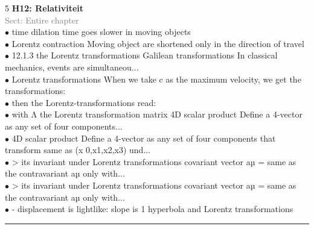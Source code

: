 \documentclass[7pt,a4paper]{article}
\begin{document}
\begin{multicols*}{5}
\textbf{H12: Relativiteit}\\\textcolor{gray}{{Sect: Entire chapter}}\\\vspace{0.5pt}
$\bullet$ time dilation time goes slower in moving objects\\
$\bullet$ Lorentz contraction Moving object are shortened only in the direction of travel\\
$\bullet$ 12.1.3 the Lorentz transformations
Galilean transformations In classical mechanics, events are simultaneou...\\
$\bullet$ Lorentz transformations When we take c as the maximum velocity, we get the transformations:\\
$\bullet$ then the Lorentz-transformations read:\\
$\bullet$ with Λ the Lorentz transformation matrix
4D scalar product Define a 4-vector as any set of four components...\\
$\bullet$ 4D scalar product Define a 4-vector as any set of four components that transform same as (x 0,x1,x2,x3) und...\\
$\bullet$ > its invariant under Lorentz transformations
covariant vector aµ = same as the contravariant aµ only with...\\
$\bullet$ > its invariant under Lorentz transformations
covariant vector aµ = same as the contravariant aµ only with...\\
$\bullet$ - displacement is lightlike: slope is 1
hyperbola and Lorentz
transformations\\
\columnbreak


\end{multicols*}

\vspace*{-3pt}
\hrule
\vspace*{2pt}
\end{document}
